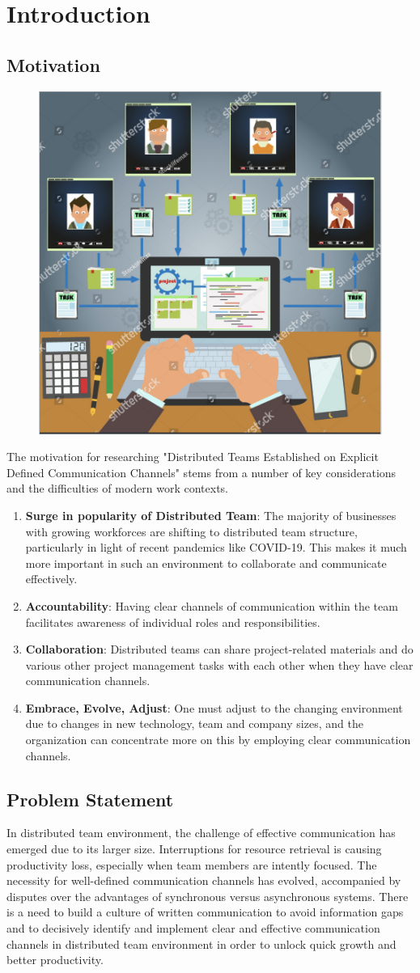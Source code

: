 \documentclass{llncs}
\begin{document}
\section{ Introduction}
\subsection{ Motivation}

\begin{figure}   
    \includegraphics[width=0.2\linewidth]{DTlogo.png}
\end{figure}

The motivation for researching "Distributed Teams Established on Explicit Defined Communication Channels" stems from a number of key considerations and the difficulties of modern work contexts. \\

\begin{enumerate}
    \item \textbf{Surge in popularity of Distributed Team}: The majority of businesses with growing workforces are shifting to distributed team structure, particularly in light of recent pandemics like COVID-19. This makes it much more important in such an environment to collaborate and communicate effectively.~\cite{refbook1}
    \item \textbf{Accountability}: Having clear channels of communication within the team facilitates awareness of individual roles and responsibilities.~\cite{refbook1}
    \item \textbf{Collaboration}: Distributed teams can share project-related materials and do various other project management tasks with each other when they have clear communication channels.~\cite{refbook1}
    \item \textbf{Embrace, Evolve, Adjust}: One must adjust to the changing environment due to changes in new technology, team and company sizes, and the organization can concentrate more on this by employing clear communication channels.~\cite{refbook1}
\end{enumerate}

\subsection{Problem Statement} In distributed team environment, the challenge of effective communication has emerged due to its larger size. Interruptions for resource retrieval is causing productivity loss, especially when team members are intently focused. The necessity for well-defined communication channels has evolved, accompanied by disputes over the advantages of synchronous versus asynchronous systems. There is a need to build a culture of written communication to avoid information gaps and to decisively identify and implement clear and effective communication channels in distributed team environment in order to unlock quick growth and better productivity.~\cite{refbook1}
\end{document}
